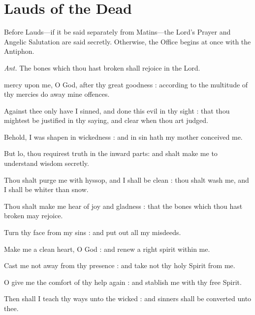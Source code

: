 \section{Lauds of the Dead}\label{laudsdead}
\begin{rubric}
    Before Lauds---if it be said separately from Matins---the Lord's Prayer and Angelic Salutation are said secretly. Otherwise, the Office begins at once with the Antiphon.
\end{rubric}
\par\noindent
\textit{Ant.} The bones which thou hast broken {\dag} shall rejoice in the Lord.\par
{} mercy upon me, O God, after thy great goodness : according to the multitude of thy mercies do away mine offences.\par
{}
Against thee only have I sinned, and done this evil in thy sight : that thou mightest be justified in thy saying, and clear when thou art judged.\par
{}Behold, I was shapen in wickedness : and in sin hath my mother conceived me.\par
{}But lo, thou requirest truth in the inward parts: and shalt make me to understand wisdom secretly.\par
{}Thou shalt purge me with hyssop, and I shall be clean : thou shalt wash me, and I shall be whiter than snow.\par
{}Thou shalt make me hear of joy and gladness : that the bones which thou hast broken may rejoice.\par
{}Turn thy face from my sins : and put out all my misdeeds.\par
{}Make me a clean heart, O God : and renew a right spirit within me.\par
{}Cast me not away from thy presence : and take not thy holy Spirit from me.\par
{}O give me the comfort of thy help again : and stablish me with thy free Spirit.\par
{}Then shall I teach thy ways unto the wicked : and sinners shall be converted unto thee.\par
